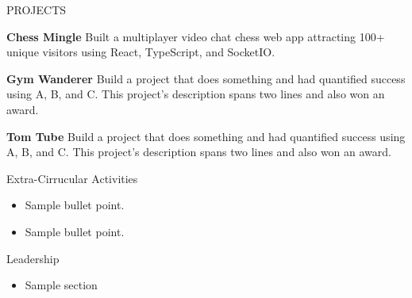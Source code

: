 
\begin{rSection}{PROJECTS}
	\vspace{-1.25em}

\item \textbf{Chess Mingle} {Built a multiplayer video chat chess web app attracting 100+ unique visitors using React, TypeScript, and SocketIO.} 
\item \textbf{Gym Wanderer} {Build a project that does something and had quantified success using A, B, and C. This project's description spans two lines and also won an award.}
\item \textbf{Tom Tube} {Build a project that does something and had quantified success using A, B, and C. This project's description spans two lines and also won an award.}



\end{rSection} 

\begin{rSection}{Extra-Cirrucular Activities} 
	\begin{itemize}
			    \item 	Sample bullet point.
				        \item	Sample bullet point.
	\end{itemize}


\end{rSection}

\begin{rSection}{Leadership} 
	\begin{itemize}
			    \item Sample section
	\end{itemize}


\end{rSection}




